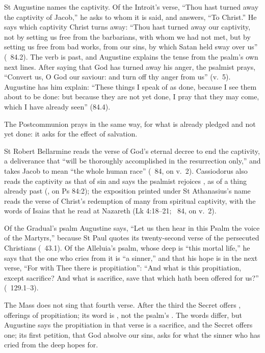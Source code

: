 St Augustine names the captivity. Of the Introit's verse, ``Thou hast turned
away the captivity of Jacob,'' he asks to whom it is said, and answers, ``To
Christ.'' He says which captivity Christ turns away: ``Thou hast
turned away our captivity, not by setting us free from the barbarians, with
whom we had not met, but by setting us free from bad works, from our sins, by
which Satan held sway over us'' (\ 84.2). The verb is
past, and Augustine explains the tense from the psalm's own next lines. After
saying that God has turned away his anger, the psalmist prays, ``Convert us,
O God our saviour: and turn off thy anger from us'' (v.~5). Augustine has him
explain: ``These things I speak of as done, because I see them about to be
done: but because they are not yet done, I pray that they may come, which I
have already seen'' (84.4).

The Postcommunion prays in the same way, for what is already pledged and
not yet done: it asks for the effect of salvation.

St Robert Bellarmine reads the verse of God's eternal decree to end the
captivity, a deliverance that ``will be thoroughly accomplished in the
resurrection only,'' and takes Jacob to mean ``the whole human race''
(\ 84, on v.~2). Cassiodorus also reads the
captivity as that of sin and says the psalmist rejoices , as of a thing already past (, on Ps
84:2); the
exposition printed under St Athanasius's name reads the verse of Christ's
redemption of many from spiritual captivity, with the words of Isaias that he
read at Nazareth (Lk 4:18--21; \ 84, on v.~2).

Of the Gradual's psalm Augustine says, ``Let us then hear in this Psalm the
voice of the Martyrs,'' because St Paul quotes its twenty-second verse of the
persecuted Christians (\ 43.1). Of the Alleluia's psalm,
whose deep is ``this mortal life,'' he says that the one who cries from it is
``a sinner,'' and that his hope is in the next verse, ``For with Thee there is
propitiation'': ``And what is this propitiation, except sacrifice? And what is
sacrifice, save that which hath been offered for us?'' (\
129.1--3).

The Mass does not sing that fourth verse. After the third 
the Secret offers \latin{hóstias \dots\ placatiónis}, offerings of
propitiation; its word is \latin{placatio}, not the psalm's
. The words differ, but Augustine says the propitiation in
that verse is a sacrifice, and the Secret offers one; its first petition,
that God absolve our sins, asks for what the sinner who has cried from the
deep hopes for.

